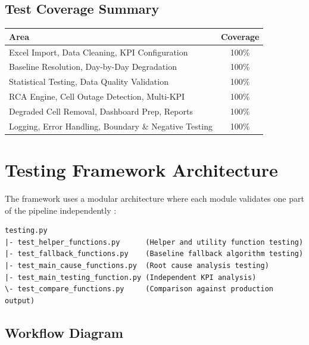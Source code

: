 \subsection{Test Coverage Summary}
\begin{table}[h!]
\centering
\begin{tabularx}{0.7\textwidth}{X c}
\toprule
\textbf{Area} & \textbf{Coverage} \\
\midrule
Excel Import, Data Cleaning, KPI Configuration & 100\% \\
Baseline Resolution, Day-by-Day Degradation & 100\% \\
Statistical Testing, Data Quality Validation & 100\% \\
RCA Engine, Cell Outage Detection, Multi-KPI & 100\% \\
Degraded Cell Removal, Dashboard Prep, Reports & 100\% \\
Logging, Error Handling, Boundary \& Negative Testing & 100\% \\
\bottomrule
\end{tabularx}
\end{table}

\section{Testing Framework Architecture}
The framework uses a modular architecture where each module validates one part of the pipeline independently :

\begin{verbatim}
testing.py
|- test_helper_functions.py      (Helper and utility function testing)
|- test_fallback_functions.py    (Baseline fallback algorithm testing)
|- test_main_cause_functions.py  (Root cause analysis testing)
|- test_main_testing_function.py (Independent KPI analysis)
\- test_compare_functions.py     (Comparison against production output)
\end{verbatim}

\subsection{Workflow Diagram}

